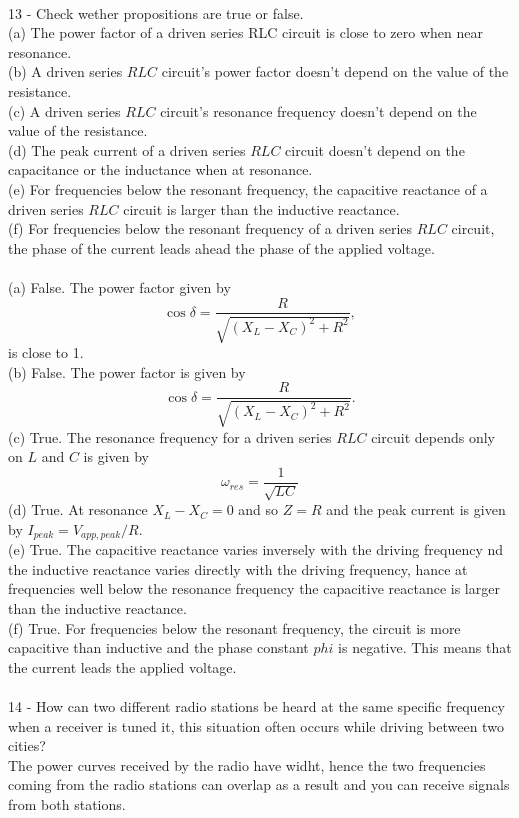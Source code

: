 \documentclass{report}
\begin{document}
\paragraph{}
13 - Check wether propositions are true or false.\\
(a) The power factor of a driven series RLC circuit is close to zero when near resonance.\\
(b) A driven series $RLC$ circuit's power factor doesn't depend on the value of the resistance.\\
(c) A driven series $RLC$ circuit's resonance frequency doesn't depend on the value of the resistance.\\
(d) The peak current of a driven series $RLC$ circuit doesn't depend on the capacitance or the inductance when at resonance.\\
(e) For frequencies below the resonant frequency, the capacitive reactance of a driven series $RLC$ circuit is larger than the inductive reactance.\\
(f) For frequencies below the resonant frequency of a driven series $RLC$ circuit, the phase of the current leads ahead the phase of the applied voltage.\\
\\
(a) False. The power factor given by
$$\cos \delta = \frac{R}{\sqrt{(X_L - X_C)^2 +R^2}},$$
is close to 1.\\
(b) False. The power factor is given by
$$\cos \delta = \frac{R}{\sqrt{(X_L - X_C)^2 +R^2}}.$$
(c) True. The resonance frequency for a driven series $RLC$ circuit depends only on $L$ and $C$ is given by
$$\omega_{res} = \frac{1}{\sqrt{LC}}$$
(d) True. At resonance $X_L - X_C = 0$ and so $Z = R$ and the peak current is given by $I_{peak} = V_{app,peak}/R.$\\
(e) True. The capacitive reactance varies inversely with the driving frequency nd the inductive reactance varies directly with the driving frequency, hance at frequencies well below the resonance frequency the capacitive reactance is larger than the inductive reactance.\\
(f) True. For frequencies below the resonant frequency, the circuit is more capacitive than inductive and the phase constant $phi$ is negative. This means that the current leads the applied voltage.\\

\paragraph{}
14 - How can two different radio stations be heard at the same specific frequency when a receiver is tuned it, this situation often occurs while driving between two cities?\\
The power curves received by the radio have widht, hence the two frequencies coming from the radio stations can overlap as a result and you can receive signals from both stations.
\end{document}
